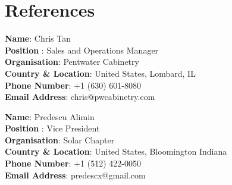 \documentclass[a4paper,11pt]{article}
\makeatletter
\newcommand{\resumePOR}[3]{
\vspace{0.5mm}\item
    \begin{tabular*}{0.97\textwidth}[t]{l@{\extracolsep{\fill}}r}
        \textbf{#1}\hspace{0.3mm}#2 & \textit{\small{#3}} 
    \end{tabular*}
    \vspace{-2mm}
}
\newcommand{\resumeSubHeadingListStart}{\begin{itemize}[leftmargin=*,labelsep=0mm]}
\newcommand{\resumeSubHeadingListEnd}{\end{itemize}\vspace{2mm}}
\makeatother
\begin{document}
\section{\textbf{References}}
 \begin{itemize}[leftmargin=0.05in, label={}]
    \small{\item{
     \textbf{Name}{: Chris Tan} \\
     \textbf{Position }{: Sales and Operations Manager }\\ 
     \textbf{Organisation}{: Pentwater Cabinetry } \\ 
     \textbf{Country \& Location}{: United States, Lombard, IL} \\
     \textbf{Phone Number}{: +1 (630) 601-8080 } \\  
     \textbf{Email Address}{: chris@pwcabinetry.com}\\
    }}

    \small{\item{
     \textbf{Name}{: Predescu Alimin} \\
     \textbf{Position }{: Vice President }\\ 
     \textbf{Organisation}{: Solar Chapter } \\ 
     \textbf{Country \& Location}{: United States, Bloomington Indiana} \\
     \textbf{Phone Number}{: +1 (512) 422-0050} \\  
     \textbf{Email Address}{: predescx@gmail.com }\\
    }}
 \end{itemize}
 \vspace{-16pt}






    
     
 



\end{document}
